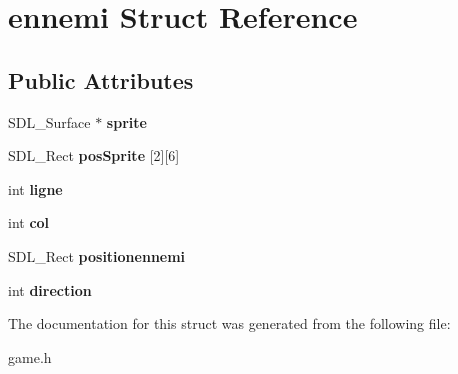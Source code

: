 \hypertarget{structennemi}{}\section{ennemi Struct Reference}
\label{structennemi}
\subsection*{Public Attributes}
\begin{DoxyCompactItemize}
\item 
\mbox{\label{structennemi_a8e471648b06ba4ca284cf8f3627eb0cc}} 
S\+D\+L\+\_\+\+Surface $\ast$ {\bfseries sprite}
\item 
\mbox{\label{structennemi_aee4298022cf1d55295e1238e4a29da09}} 
S\+D\+L\+\_\+\+Rect {\bfseries pos\+Sprite} \mbox{[}2\mbox{]}\mbox{[}6\mbox{]}
\item 
\mbox{\label{structennemi_a5e0f636272e7b6288e509366e6581cac}} 
int {\bfseries ligne}
\item 
\mbox{\label{structennemi_a334dccd66e75496aeedce276c7517d9c}} 
int {\bfseries col}
\item 
\mbox{\label{structennemi_a9b9ae4b1640799f1f59ad5d3aaa61748}} 
S\+D\+L\+\_\+\+Rect {\bfseries positionennemi}
\item 
\mbox{\label{structennemi_aa1f57a616910ffd5799f1097a3160e0b}} 
int {\bfseries direction}
\end{DoxyCompactItemize}


The documentation for this struct was generated from the following file\+:\begin{DoxyCompactItemize}
\item 
game.\+h\end{DoxyCompactItemize}
